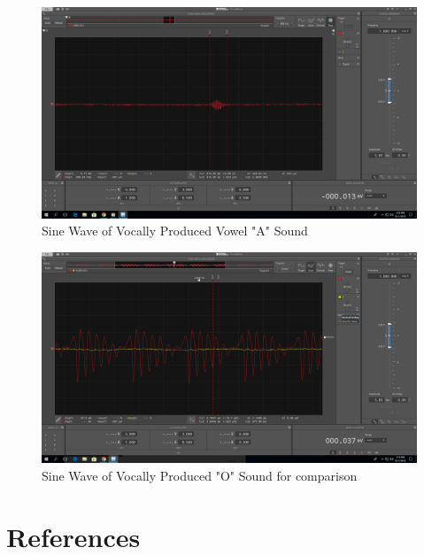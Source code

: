 \documentclass[10pt]{article}
\begin{document}
\begin{center}
	\begin{figure}[H]
		\centering
		\includegraphics[scale=0.22]{images/aaa.png}
		\caption{Sine Wave of Vocally Produced Vowel "A" Sound}
	\end{figure}
	\begin{figure}[H]
		\centering
		\includegraphics[scale=0.22]{images/ooo.png}
		\caption{Sine Wave of Vocally Produced "O" Sound for comparison}
	\end{figure}
\end{center}






\medskip


\section{References}
\end{document}
